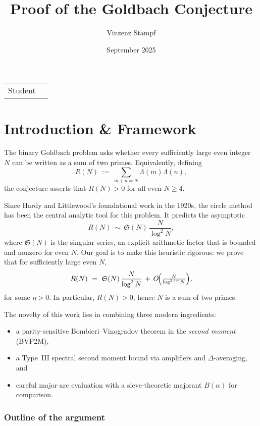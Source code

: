 \documentclass[11pt]{article}
\title{Proof of the Goldbach Conjecture}
\author{Vinzenz Stampf}
\date{September 2025}
\makeatletter
\theoremstyle{definition}
\theoremstyle{remark}
\numberwithin{equation}{part}
\providecommand{\theauthor}{\@author}
\makeatother
\begin{document}
\tableofcontents

\maketitle

\noindent\begin{tabular}{@{}ll}
	Student & \theauthor \\
\end{tabular}


\part{Introduction \& Framework}

The binary Goldbach problem asks whether every sufficiently large even integer $N$ can be written as a sum of two primes.
Equivalently, defining
\[
	R(N)\ :=\ \sum_{m+n=N}\Lambda(m)\Lambda(n),
\]
the conjecture asserts that $R(N)>0$ for all even $N\ge4$.

Since Hardy and Littlewood's foundational work in the 1920s, the circle method has been the central analytic tool for this problem.
It predicts the asymptotic
\[
	R(N)\ \sim\ \mathfrak S(N)\,\frac{N}{\log^2 N},
\]
where $\mathfrak S(N)$ is the singular series, an explicit arithmetic factor that is bounded and nonzero for even $N$.
Our goal is to make this heuristic rigorous: we prove that for sufficiently large even $N$,
\[
	R(N)\ =\ \mathfrak S(N)\,\frac{N}{\log^2 N} \,+\, O\!\Bigl(\tfrac{N}{\log^{2+\eta}N}\Bigr),
\]
for some $\eta>0$.
In particular, $R(N)>0$, hence $N$ is a sum of two primes.

\medskip
The novelty of this work lies in combining three modern ingredients:
\begin{itemize}[leftmargin=2em]
	\item a parity-sensitive Bombieri--Vinogradov theorem in the \emph{second moment} (BVP2M),
	\item a Type~III spectral second moment bound via amplifiers and $\Delta$-averaging, and
	\item careful major-arc evaluation with a sieve-theoretic majorant $B(\alpha)$ for comparison.
\end{itemize}

\section*{Outline of the argument}
\end{document}
